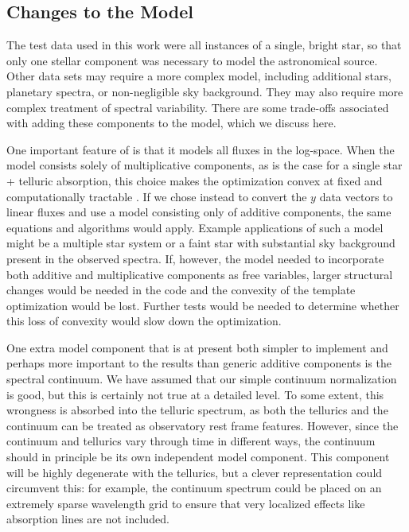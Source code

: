 \documentclass[modern]{aastex62}
\begin{document}
{\subsection{Changes to the Model}
\label{s:model-changes}
 
The test data used in this work were all instances of a single, bright star, so that only one stellar component was necessary to model the astronomical source. 
Other data sets may require a more complex model, including additional stars, planetary spectra, or non-negligible sky background. 
They may also require more complex treatment of spectral variability. 
There are some trade-offs associated with adding these components to the model, which we discuss here.

One important feature of \wobble is that it models all fluxes in the log-space. 
When the model consists solely of multiplicative components, as is the case for a single star + telluric absorption, this choice makes the optimization convex at fixed \RV and computationally tractable . 
If we chose instead to convert the $y$ data vectors to linear fluxes and use a model consisting only of additive components, the same equations and algorithms would apply. 
Example applications of such a model might be a multiple star system or a faint star with substantial sky background present in the observed spectra. 
If, however, the model needed to incorporate both additive and multiplicative
components as free variables, larger structural changes would be needed in the code and the convexity of the template optimization would be lost. 
Further tests would be needed to determine whether this loss of convexity would slow down the optimization. 

One extra model component that is at present both simpler to implement and perhaps more important to the results than generic additive components is the spectral continuum. 
We have assumed that our simple continuum normalization is good, but this is certainly not true at a detailed level. 
To some extent, this wrongness is absorbed into the telluric spectrum, as both the tellurics and the continuum can be treated as observatory rest frame features. 
However, since the continuum and tellurics vary through time in different ways, the continuum should in principle be its own independent model component. 
This component will be highly degenerate with the tellurics, but a clever representation could circumvent this: for example, the continuum spectrum could be placed on an extremely sparse wavelength grid to ensure that very localized effects like absorption lines are not included.

}
\end{document}
